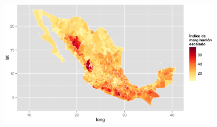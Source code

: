 \documentclass{beamer}
\begin{document}
\begin{frame}
  \begin{figure}[!ht]
  \centering
  \includegraphics[width=1\textwidth]{./maps/mapmarg.png} \\
  \end{figure}
\end{frame}
\end{document}
